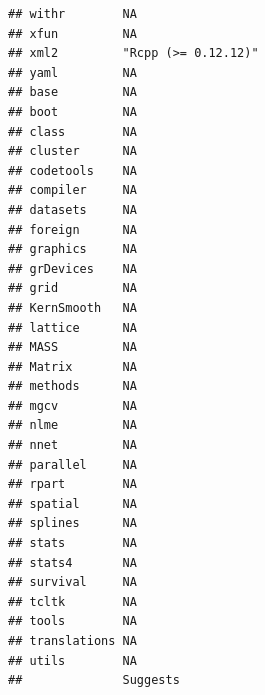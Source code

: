 \documentclass[]{article}
\begin{document}
\begin{verbatim}
## withr        NA                                                    
## xfun         NA                                                    
## xml2         "Rcpp (>= 0.12.12)"                                   
## yaml         NA                                                    
## base         NA                                                    
## boot         NA                                                    
## class        NA                                                    
## cluster      NA                                                    
## codetools    NA                                                    
## compiler     NA                                                    
## datasets     NA                                                    
## foreign      NA                                                    
## graphics     NA                                                    
## grDevices    NA                                                    
## grid         NA                                                    
## KernSmooth   NA                                                    
## lattice      NA                                                    
## MASS         NA                                                    
## Matrix       NA                                                    
## methods      NA                                                    
## mgcv         NA                                                    
## nlme         NA                                                    
## nnet         NA                                                    
## parallel     NA                                                    
## rpart        NA                                                    
## spatial      NA                                                    
## splines      NA                                                    
## stats        NA                                                    
## stats4       NA                                                    
## survival     NA                                                    
## tcltk        NA                                                    
## tools        NA                                                    
## translations NA                                                    
## utils        NA                                                    
##              Suggests                                                                                                                                                                                                                                                                                                                                                                                                                                                                                                                                                                                  

\end{verbatim}
\end{document}
